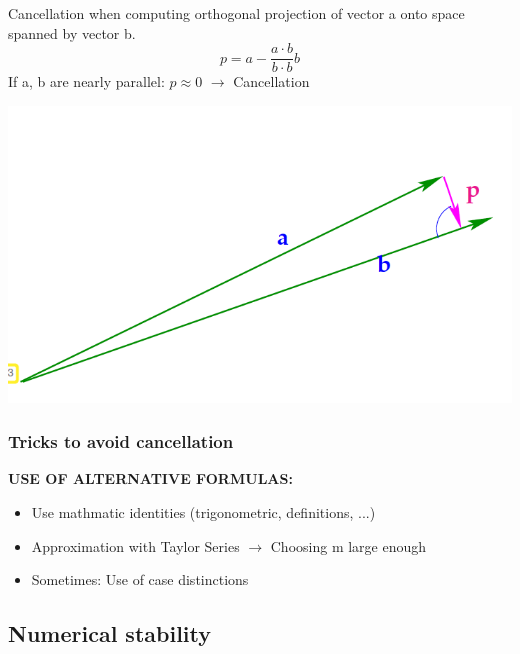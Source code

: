 \documentclass[12pt, a4paper]{article}
\begin{document}
\begin{minipage}{0.6\textwidth}
Cancellation when computing orthogonal projection of vector a onto space spanned by vector b.
\begin{equation*}
	p = a - \frac{a \cdot b }{b \cdot b}b
\end{equation*}
If a, b are nearly parallel: $p \approx 0$ $\rightarrow$ Cancellation
\end{minipage}
\begin{minipage}{0.3\textwidth}\raggedleft
 		 \includegraphics[width=1.0\textwidth]{cancellation_gramSchmidt.png}
 \end{minipage}



\subsubsection{Tricks to avoid cancellation}
 
 \begin{tcolorbox}
 \textbf{USE OF ALTERNATIVE FORMULAS:}
 \begin{itemize}
  \item Use mathmatic identities (trigonometric, definitions, ...)
  \item Approximation with Taylor Series $\rightarrow$ Choosing m large enough
  \item Sometimes: Use of case distinctions
\end{itemize}
\end{tcolorbox}


\subsection{Numerical stability}
\end{document}
